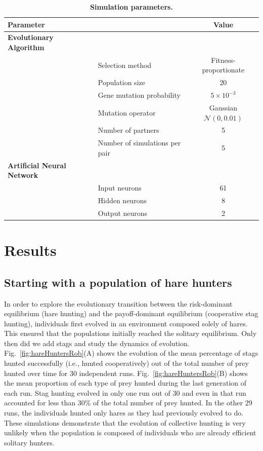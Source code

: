     \begin{table}[ht]
      \centering
        \begin{tabular}{|l|l|c|}
          \hline
          \multicolumn{2}{|l|}{\textbf{Parameter}} & \textbf{Value} \\
          \hline
          \hline
          \textbf{Evolutionary Algorithm} & & \\
          \hline
          & Selection method & Fitness-proportionate \\
          \hline
          & Population size & 20 \\
          \hline
          & Gene mutation probability & \(5 \times 10^{-3}\) \\
          \hline
          & Mutation operator & Gaussian \(\mathcal{N}(0, 0.01)\) \\
          \hline
          & Number of partners & 5 \\
          \hline
          & Number of simulations per pair & 5 \\
          \hline

          \textbf{Artificial Neural Network} & & \\
          \hline
          & Input neurons & 61 \\
          \hline
          & Hidden neurons & 8 \\
          \hline
          & Output neurons & 2 \\
          \hline
        \end{tabular}
        \caption{\textbf{Simulation parameters.}}
      \label{table:tableParameters}
    \end{table}

\section{Results}
\label{sec:results}
  \subsection{Starting with a population of hare hunters}
    In order to explore the evolutionary transition between the risk-dominant equilibrium (hare hunting) and the payoff-dominant equilibrium (cooperative stag hunting), individuals first evolved in an environment composed solely of hares. This ensured that the populations initially reached the solitary equilibrium. Only then did we add stags and study the dynamics of evolution. Fig.~\ref{fig:hareHuntersRob}(A) shows the evolution of the mean percentage of stags hunted successfully (i.e., hunted cooperatively) out of the total number of prey hunted over time for 30 independent runs. Fig.~\ref{fig:hareHuntersRob}(B) shows the mean proportion of each type of prey hunted during the last generation of each run. Stag hunting evolved in only one run out of $30$ and even in that run accounted for less than 30\% of the total number of prey hunted. In the other $29$ runs, the individuals hunted only hares as they had previously evolved to do. These simulations demonstrate that the evolution of collective hunting is very unlikely when the population is composed of individuals who are already efficient solitary hunters.

